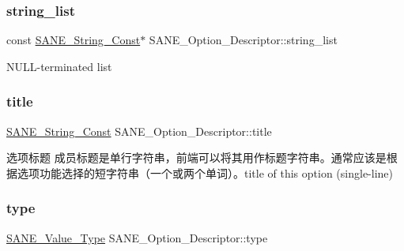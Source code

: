 \subsubsection{\texorpdfstring{string\+\_\+list}{string\_list}}
{\footnotesize\ttfamily const \hyperlink{sane_8h_a9a47323dab2a36db080f1bcc11585af4}{S\+A\+N\+E\+\_\+\+String\+\_\+\+Const}$\ast$ S\+A\+N\+E\+\_\+\+Option\+\_\+\+Descriptor\+::string\+\_\+list}

N\+U\+L\+L-\/terminated list \mbox{\label{structSANE__Option__Descriptor_a069392f9b5739153679dcccfd2bb50fe}} 
\subsubsection{\texorpdfstring{title}{title}}
{\footnotesize\ttfamily \hyperlink{sane_8h_a9a47323dab2a36db080f1bcc11585af4}{S\+A\+N\+E\+\_\+\+String\+\_\+\+Const} S\+A\+N\+E\+\_\+\+Option\+\_\+\+Descriptor\+::title}

选项标题 成员标题是单行字符串，前端可以将其用作标题字符串。通常应该是根据选项功能选择的短字符串（一个或两个单词）。title of this option (single-\/line) \mbox{\label{structSANE__Option__Descriptor_a0f7c7e0902094d466389a82671b5b150}} 
\subsubsection{\texorpdfstring{type}{type}}
{\footnotesize\ttfamily \hyperlink{sane_8h_aed3324dea8f24f5381e12e5562aaf72b}{S\+A\+N\+E\+\_\+\+Value\+\_\+\+Type} S\+A\+N\+E\+\_\+\+Option\+\_\+\+Descriptor\+::type}

